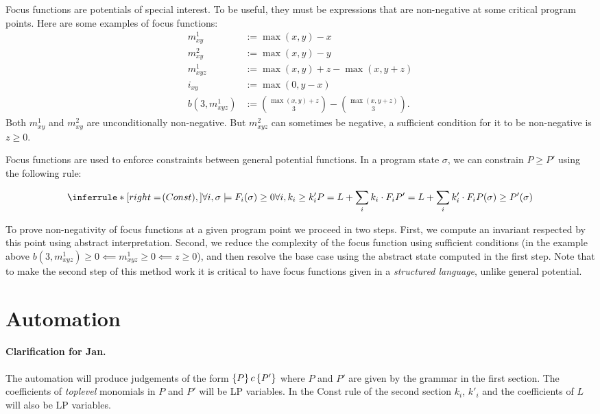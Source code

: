 \documentclass[nocopyrightspace,preprint]{sigplanconf-pldi15}
\begin{document}
Focus functions are potentials of special interest.
To be useful, they must be expressions that are non-negative
at some critical program points.  Here are some examples
of focus functions:
%
\begin{align*}
m_{xy}^1 &:= \max(x,y) - x \\
m_{xy}^2 &:= \max(x,y) - y \\
m_{xyz}^1 &:= \max(x, y) + z - \max(x,y+z) \\
i_{xy} &:= \max(0, y - x) \\
b(3, m_{xyz}^{1}) &:= \binom{\max(x,y) + z}{3} - \binom{\max(x, y+z)}{3}.
\end{align*}
%
Both $m_{xy}^1$ and $m_{xy}^2$ are unconditionally non-negative.
But $m_{xyz}^2$ can sometimes be negative, a sufficient condition
for it to be non-negative is $z \ge 0$.

Focus functions are used to enforce constraints between
general potential functions.  In a program state $\sigma$,
we can constrain $P \ge P'$ using the following rule:

$$
\Rule{Const}
{
  \forall i, \sigma \models F_i(\sigma) \ge 0 \\
  \forall i, k_i \ge k'_i \\\\
  P = L + \sum_i k_i \cdot F_i \\
  P' = L + \sum_i k'_i \cdot F_i
}
{P(\sigma) \ge P'(\sigma)}
$$

To prove non-negativity of focus functions at a given program
point we proceed in two steps. First, we compute an invariant
respected by this point using abstract interpretation.  Second,
we reduce the complexity of the focus function using sufficient
conditions (in the example above $b(3, m_{xyz}^1) \ge 0 \impliedby
m_{xyz}^1 \ge 0 \impliedby z \ge 0$), and then resolve the base
case using the abstract state computed in the first step.  Note
that to make the second step of this method work it is critical
to have focus functions given in a \emph{structured language},
unlike general potential.

\section{Automation}

\paragraph{Clarification for Jan.} The automation will produce
judgements of the form $\{P\}\, c\, \{P'\}$ where $P$ and $P'$
are given by the grammar in the first section.  The coefficients
of \emph{toplevel} monomials in $P$ and $P'$ will be LP variables.
In the {\sc Const} rule of the second section $k_i$, $k'_i$ and
the coefficients of $L$ will also be LP variables.
\end{document}

